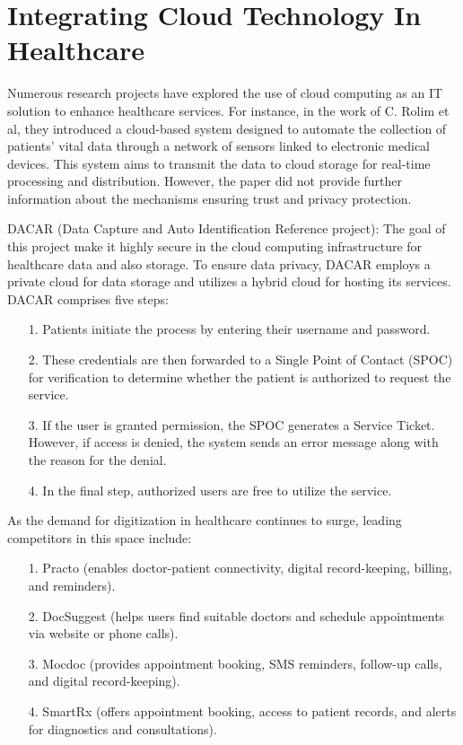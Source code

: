 \documentclass{article}
\begin{document}
\section{Integrating Cloud Technology In Healthcare}
Numerous research projects have explored the use of cloud computing as an IT solution to enhance healthcare services. For instance, in the work of C. Rolim et al, they introduced a cloud-based system designed to automate the collection of patients' vital data through a network of sensors linked to electronic medical devices. This system aims to transmit the data to cloud storage for real-time processing and distribution. However, the paper did not provide further information about the mechanisms ensuring trust and privacy protection.

DACAR (Data Capture and Auto Identification Reference project): 
The goal of this project make it highly secure in the cloud computing infrastructure for healthcare data and also storage. To ensure data privacy, DACAR employs a private cloud for data storage and utilizes a hybrid cloud for hosting its services. 
DACAR comprises five steps:
\begin{itemize}
    \item[1.] Patients initiate the process by entering their username and password.
    \item[2.] These credentials are then forwarded to a Single Point of Contact (SPOC) for verification to determine whether the patient is authorized to request the service.

    \item[3.] If the user is granted permission, the SPOC generates a Service Ticket. However, if access is denied, the system sends an error message along with the reason for the denial.

    \item[4.] In the final step, authorized users are free to utilize the service.
\end{itemize}

\bigskip
\bigskip
\bigskip

As the demand for digitization in healthcare continues to surge, leading competitors in this space include:
\begin{itemize}
    \item[1.] Practo (enables doctor-patient connectivity, digital record-keeping, billing, and reminders).
    \item[2.] DocSuggest (helps users find suitable doctors and schedule appointments via website or phone calls).
    \item[3.] Mocdoc (provides appointment booking, SMS reminders, follow-up calls, and digital record-keeping).
    \item[4.] SmartRx (offers appointment booking, access to patient records, and alerts for diagnostics and consultations).
\end{itemize}
\end{document}
